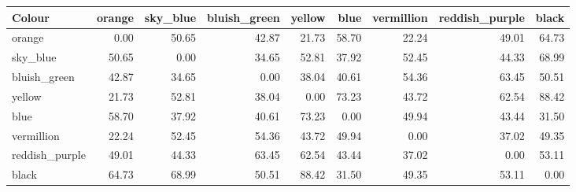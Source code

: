 \begin{tabular}{lrrrrrrrr}
\toprule
Colour & orange & sky\_blue & bluish\_green & yellow & blue & vermillion & reddish\_purple & black \\
\midrule
orange & 0.00 & 50.65 & 42.87 & 21.73 & 58.70 & 22.24 & 49.01 & 64.73 \\
sky\_blue & 50.65 & 0.00 & 34.65 & 52.81 & 37.92 & 52.45 & 44.33 & 68.99 \\
bluish\_green & 42.87 & 34.65 & 0.00 & 38.04 & 40.61 & 54.36 & 63.45 & 50.51 \\
yellow & 21.73 & 52.81 & 38.04 & 0.00 & 73.23 & 43.72 & 62.54 & 88.42 \\
blue & 58.70 & 37.92 & 40.61 & 73.23 & 0.00 & 49.94 & 43.44 & 31.50 \\
vermillion & 22.24 & 52.45 & 54.36 & 43.72 & 49.94 & 0.00 & 37.02 & 49.35 \\
reddish\_purple & 49.01 & 44.33 & 63.45 & 62.54 & 43.44 & 37.02 & 0.00 & 53.11 \\
black & 64.73 & 68.99 & 50.51 & 88.42 & 31.50 & 49.35 & 53.11 & 0.00 \\
\bottomrule
\end{tabular}
